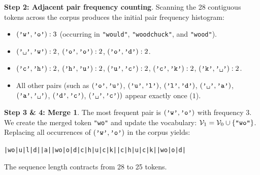 \documentclass[../../../main.tex]{subfiles}
\begin{document}
\noindent\textbf{Step 2: Adjacent pair frequency counting}.\newline
Scanning the 28 contiguous tokens across the corpus produces the initial pair frequency histogram:
\begin{itemize}
    \item $(\text{\texttt{'w'}}, \text{\texttt{'o'}}): 3$ (occurring in \texttt{"would"}, \texttt{"woodchuck"}, and \texttt{"wood"}).
    \item $(\text{\texttt{'\textvisiblespace{}'}}, \text{\texttt{'w'}}): 2$, \quad $(\text{\texttt{'o'}}, \text{\texttt{'o'}}): 2$, \quad $(\text{\texttt{'o'}}, \text{\texttt{'d'}}): 2$.
    \item $(\text{\texttt{'c'}}, \text{\texttt{'h'}}): 2$, \quad $(\text{\texttt{'h'}}, \text{\texttt{'u'}}): 2$, \quad $(\text{\texttt{'u'}}, \text{\texttt{'c'}}): 2$, \quad $(\text{\texttt{'c'}}, \text{\texttt{'k'}}): 2$, \quad $(\text{\texttt{'k'}}, \text{\texttt{'\textvisiblespace{}'}}): 2$.
    \item All other pairs (such as $(\text{\texttt{'o'}}, \text{\texttt{'u'}})$, $(\text{\texttt{'u'}}, \text{\texttt{'l'}})$, $(\text{\texttt{'l'}}, \text{\texttt{'d'}})$, $(\text{\texttt{'\textvisiblespace{}'}}, \text{\texttt{'a'}})$, $(\text{\texttt{'a'}}, \text{\texttt{'\textvisiblespace{}'}})$, $(\text{\texttt{'d'}}, \text{\texttt{'c'}})$, $(\text{\texttt{'\textvisiblespace{}'}}, \text{\texttt{'c'}}))$ appear exactly once ($1$).
\end{itemize}

\noindent\textbf{Step 3 \& 4: Merge 1}.\newline
The most frequent pair is $(\text{\texttt{'w'}}, \text{\texttt{'o'}})$ with frequency 3. We create the merged token \texttt{"wo"} and update the vocabulary: $\mathcal{V}_1 = \mathcal{V}_0 \cup \{\text{\texttt{"wo"}}\}$. Replacing all occurrences of $(\text{\texttt{'w'}}, \text{\texttt{'o'}})$ in the corpus yields:
\begin{center}
\texttt{|wo|u|l|d|\textvisiblespace{}|a|\textvisiblespace{}|wo|o|d|c|h|u|c|k|\textvisiblespace{}|c|h|u|c|k|\textvisiblespace{}|wo|o|d|}
\end{center}
The sequence length contracts from 28 to 25 tokens.
\end{document}
